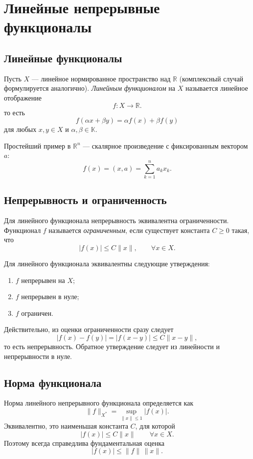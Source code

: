 \section{Линейные непрерывные функционалы}
\label{sec:continuous-linear-functionals}

\subsection{Линейные функционалы}

Пусть $X$ --- линейное нормированное пространство над $\mathbb R$
(комплексный случай формулируется аналогично). \emph{Линейным функционалом} на $X$
называется линейное отображение
\[
    f\colon X\to\mathbb R.
\]
то есть
\[
    f(\alpha x+\beta y)=\alpha f(x)+\beta f(y)
\]
для любых $x,y\in X$ и $\alpha,\beta\in\mathbb K$.

Простейший пример в $\mathbb R^n$ --- скалярное произведение с фиксированным
вектором $a$:
\[
    f(x)=(x,a)=\sum_{k=1}^n a_kx_k.
\]

\subsection{Непрерывность и ограниченность}

Для линейного функционала непрерывность эквивалентна ограниченности. Функционал
$f$ называется \emph{ограниченным}, если существует константа $C\geq0$ такая,
что
\[
    |f(x)|\leq C\|x\|,
    \qquad \forall x\in X.
\]

Для линейного функционала эквивалентны следующие утверждения:
\begin{enumerate}
    \item $f$ непрерывен на $X$;
    \item $f$ непрерывен в нуле;
    \item $f$ ограничен.
\end{enumerate}
Действительно, из оценки ограниченности сразу следует
\[
    |f(x)-f(y)|=|f(x-y)|\leq C\|x-y\|,
\]
то есть непрерывность. Обратное утверждение следует из линейности и
непрерывности в нуле.

\subsection{Норма функционала}

Норма линейного непрерывного функционала определяется как
\[
    \|f\|_{X^*}
    =\sup_{\|x\|\leq1}|f(x)|.
\]
Эквивалентно, это наименьшая константа $C$, для которой
\[
    |f(x)|\leq C\|x\|\qquad\forall x\in X.
\]
Поэтому всегда справедлива фундаментальная оценка
\[
    |f(x)|\leq\|f\|\,\|x\|.
\]

